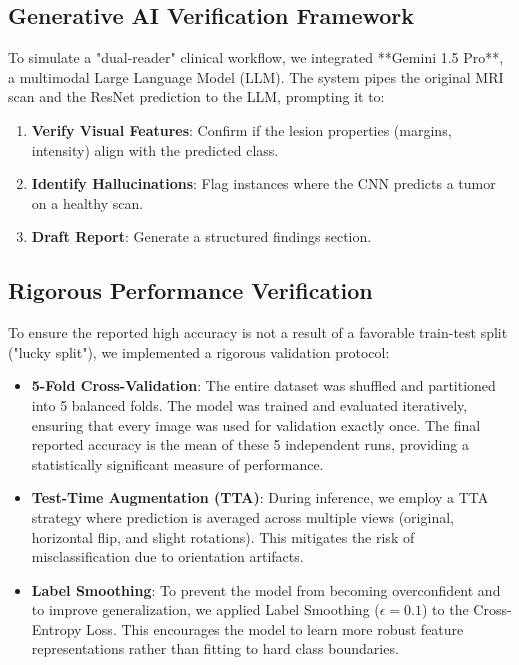 \documentclass[a4paper,11pt]{article}
\begin{document}
\subsection{Generative AI Verification Framework}
To simulate a "dual-reader" clinical workflow, we integrated **Gemini 1.5 Pro**, a multimodal Large Language Model (LLM). The system pipes the original MRI scan and the ResNet prediction to the LLM, prompting it to:
\begin{enumerate}
    \item \textbf{Verify Visual Features}: Confirm if the lesion properties (margins, intensity) align with the predicted class.
    \item \textbf{Identify Hallucinations}: Flag instances where the CNN predicts a tumor on a healthy scan.
    \item \textbf{Draft Report}: Generate a structured findings section.
\end{enumerate}

\subsection{Rigorous Performance Verification}
To ensure the reported high accuracy is not a result of a favorable train-test split ("lucky split"), we implemented a rigorous validation protocol:

\begin{itemize}
    \item \textbf{5-Fold Cross-Validation}: The entire dataset was shuffled and partitioned into 5 balanced folds. The model was trained and evaluated iteratively, ensuring that every image was used for validation exactly once. The final reported accuracy is the mean of these 5 independent runs, providing a statistically significant measure of performance.
    \item \textbf{Test-Time Augmentation (TTA)}: During inference, we employ a TTA strategy where prediction is averaged across multiple views (original, horizontal flip, and slight rotations). This mitigates the risk of misclassification due to orientation artifacts.
    \item \textbf{Label Smoothing}: To prevent the model from becoming overconfident and to improve generalization, we applied Label Smoothing ($\epsilon=0.1$) to the Cross-Entropy Loss. This encourages the model to learn more robust feature representations rather than fitting to hard class boundaries.
\end{itemize}
\end{document}
